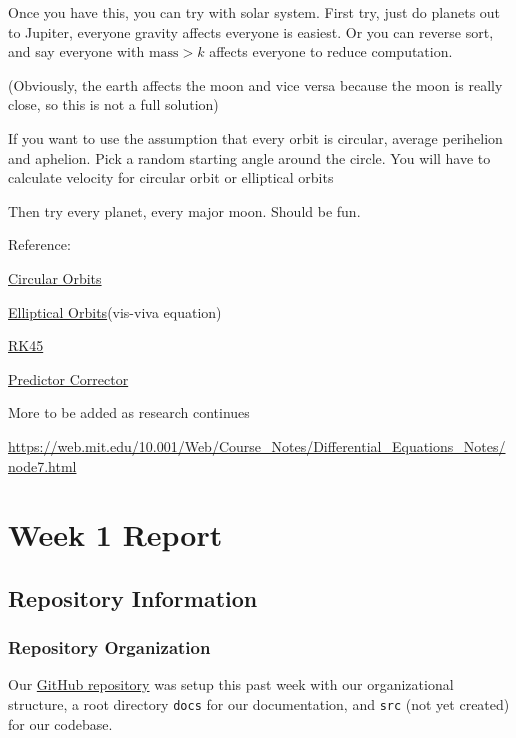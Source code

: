 \documentclass[12pt, letterpaper]{article}
\begin{document}
Once you have this, you can try with solar system. First try, just do planets out to Jupiter, everyone gravity affects everyone is easiest. Or  you can reverse sort, and say everyone with \(\text{mass} > k\) affects everyone to reduce computation.

(Obviously, the earth affects the moon and vice versa because the moon is really close, so this is not a full solution)

If you want to use the assumption that every orbit is circular, average perihelion and aphelion. Pick a random starting angle around the circle. You will have to calculate velocity for circular orbit or elliptical orbits 

Then try every planet, every major moon. Should be fun.


Reference:

\href{https://www.physicsclassroom.com/class/circles/Lesson-4/Mathematics-of-Satellite-Motion#:~:text=The\%20orbital\%20speed\%20can\%20be,speed\%20of\%207780\%20m\%2Fs}{Circular Orbits}

\href{https://en.wikipedia.org/wiki/Elliptic_orbit}{Elliptical Orbits}(vis-viva equation)

\href{https://en.wikipedia.org/wiki/Runge\%E2\%80\%93Kutta\%E2\%80\%93Fehlberg_method}{RK45}

\href{https://en.wikipedia.org/wiki/Predictor\%E2\%80\%93corrector_method}{Predictor Corrector}

More to be added as research continues

\href{https://web.mit.edu/10.001/Web/Course\_Notes/Differential\_Equations_Notes/node7.html}{https://web.mit.edu/10.001/Web/Course\_Notes/Differential\_Equations_Notes/node7.html}


\section{Week 1 Report}
\subsection{Repository Information}
\subsubsection{Repository Organization}
Our \href{https://github.com/PMARINA/CPE593-FinalProject}{GitHub repository} was setup this past week with our organizational structure, a root directory \texttt{docs} for our documentation, and \texttt{src} (not yet created) for our codebase. 
\end{document}
